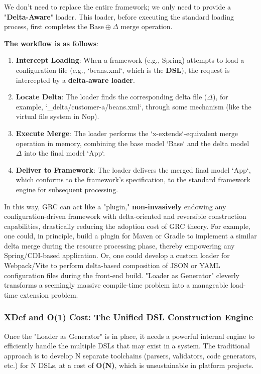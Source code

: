 \documentclass[11pt]{article}
\begin{document}
We don't need to replace the entire framework; we only need to provide a "\textbf{Delta-Aware}" loader. This loader, before executing the standard loading process, first completes the $\text{Base} \oplus \Delta$ merge operation.

\textbf{The workflow is as follows}:
\begin{enumerate}
    \item \textbf{Intercept Loading}: When a framework (e.g., Spring) attempts to load a configuration file (e.g., `beans.xml`, which is the \textbf{DSL}), the request is intercepted by a \textbf{delta-aware loader}.
    \item \textbf{Locate Delta}: The loader finds the corresponding delta file ($\Delta$), for example, `\_delta/customer-a/beans.xml`, through some mechanism (like the virtual file system in Nop).
    \item \textbf{Execute Merge}: The loader performs the `x-extends`-equivalent merge operation in memory, combining the base model `Base` and the delta model $\Delta$ into the final model `App`.
    \item \textbf{Deliver to Framework}: The loader delivers the merged final model `App`, which conforms to the framework's specification, to the standard framework engine for subsequent processing.
\end{enumerate}

In this way, GRC can act like a "plugin," \textbf{non-invasively} endowing any configuration-driven framework with delta-oriented and reversible construction capabilities, drastically reducing the adoption cost of GRC theory. For example, one could, in principle, build a plugin for Maven or Gradle to implement a similar delta merge during the resource processing phase, thereby empowering any Spring/CDI-based application. Or, one could develop a custom loader for Webpack/Vite to perform delta-based composition of JSON or YAML configuration files during the front-end build. "Loader as Generator" cleverly transforms a seemingly massive compile-time problem into a manageable load-time extension problem.

\subsubsection{XDef and O(1) Cost: The Unified DSL Construction Engine}

Once the "Loader as Generator" is in place, it needs a powerful internal engine to efficiently handle the multiple DSLs that may exist in a system. The traditional approach is to develop N separate toolchains (parsers, validators, code generators, etc.) for N DSLs, at a cost of \textbf{O(N)}, which is unsustainable in platform projects.
\end{document}
